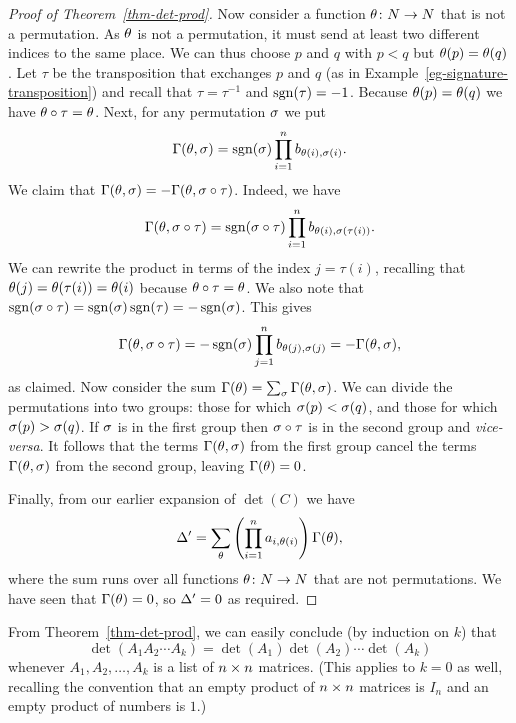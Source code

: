 \documentclass[reqno]{amsart}
\theoremstyle{definition}
\begin{document}
\begin{proof}[Proof of Theorem~\ref{thm-det-prod}]
 Now consider a function $\theta\colon N\to N$ that is not a permutation.  As
 $\theta$ is not a permutation, it must send at least two different
 indices to the same place.  We can thus choose $p$ and $q$ with $p<q$
 but $\theta(p)=\theta(q)$.  Let $\tau$ be the transposition that
 exchanges $p$ and $q$ (as in
 Example~\ref{eg-signature-transposition}) and recall that
 $\tau=\tau^{-1}$ and $\operatorname{sgn}(\tau)=-1$.  Because $\theta(p)=\theta(q)$ we
 have $\theta\circ\tau=\theta$.  Next, for any permutation $\sigma$ we put
 \[ \Gamma(\theta,\sigma) = \operatorname{sgn}(\sigma)\prod_{i=1}^n b_{\theta(i),\sigma(i)}. \]
 We claim that $\Gamma(\theta,\sigma)=-\Gamma(\theta,\sigma\circ\tau)$.  Indeed, we
 have
 \[ \Gamma(\theta,\sigma\circ\tau) =
     \operatorname{sgn}(\sigma\circ\tau)\prod_{i=1}^n b_{\theta(i),\sigma(\tau(i))}.
 \]
 We can rewrite the product in terms of the index $j=\tau(i)$,
 recalling that $\theta(j)=\theta(\tau(i))=\theta(i)$ because
 $\theta \circ \tau = \theta$.  We also note that
 $\operatorname{sgn}(\sigma\circ\tau)=\operatorname{sgn}(\sigma)\operatorname{sgn}(\tau)=-\operatorname{sgn}(\sigma)$.  This gives
 \[ \Gamma(\theta,\sigma\circ\tau) =
     -\operatorname{sgn}(\sigma)\prod_{j=1}^n b_{\theta(j),\sigma(j)} = -\Gamma(\theta,\sigma),
 \]
 as claimed.  Now consider the sum $\Gamma(\theta)=\sum_\sigma\Gamma(\theta,\sigma)$.
 We can divide the permutations into two groups: those for which
 $\sigma(p)<\sigma(q)$, and those for which $\sigma(p)>\sigma(q)$.  If $\sigma$ is in
 the first group then $\sigma\circ\tau$ is in the second group and
 \emph{vice-versa}.  It follows that the terms $\Gamma(\theta,\sigma)$ from
 the first group cancel the terms $\Gamma(\theta,\sigma)$ from the second
 group, leaving $\Gamma(\theta)=0$.

 Finally, from our earlier expansion of $\det(C)$ we have
 \[ \Delta' =
     \sum_\theta \left(\prod_{i=1}^na_{i,\theta(i)}\right) \Gamma(\theta),
 \]
 where the sum runs over all functions $\theta\colon N\to N$ that are not
 permutations.  We have seen that $\Gamma(\theta)=0$, so $\Delta'=0$ as
 required.
\end{proof}

From Theorem~\ref{thm-det-prod}, we can easily conclude (by
induction on $k$) that
\begin{equation}
\det\left(A_1 A_2 \cdots A_k\right)
= \det\left(A_1\right) \det\left(A_2\right) \cdots \det\left(A_k\right)
\label{eq.det.prodAk}
\end{equation}
whenever $A_1, A_2, \ldots, A_k$ is a list of
$n\times n$ matrices.
(This applies to $k = 0$ as well, recalling the convention
that an empty product of $n\times n$ matrices is $I_n$ and
an empty product of numbers is $1$.)
\end{document}
